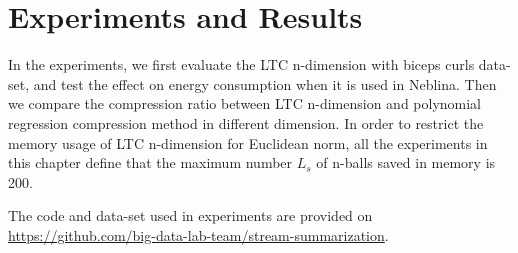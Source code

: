 \chapter{Experiments and Results}
\label{chap:expsAndResults}
In the experiments, we first evaluate the LTC n-dimension with biceps curls
data-set, and test the effect on energy consumption when it is used in Neblina.
Then we compare the compression ratio between LTC n-dimension and polynomial
regression compression method in different dimension. In order to restrict the
memory usage of LTC n-dimension for Euclidean norm, all the experiments in this
chapter define that the maximum number $L_s$ of n-balls saved in memory is 200.

The code and data-set used in experiments are provided on
\url{https://github.com/big-data-lab-team/stream-summarization}. 





